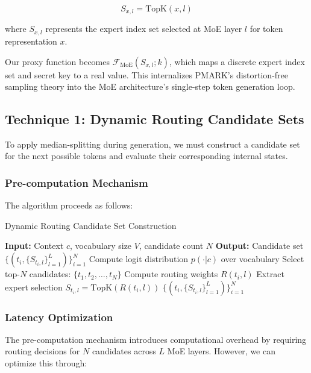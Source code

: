 \documentclass[letterpaper,twocolumn,10pt]{article}
\begin{document}
\begin{equation}
S_{x,l} = \text{TopK}(x, l)
\end{equation}

where $S_{x,l}$ represents the expert index set selected at MoE layer $l$ for token representation $x$.

Our proxy function becomes $\mathcal{F}_{\text{MoE}}(S_{x,l}; k)$, which maps a discrete expert index set and secret key to a real value. This internalizes PMARK's distortion-free sampling theory into the MoE architecture's single-step token generation loop.

\subsection{Technique 1: Dynamic Routing Candidate Sets}

To apply median-splitting during generation, we must construct a candidate set for the next possible tokens and evaluate their corresponding internal states.

\subsubsection{Pre-computation Mechanism}

The algorithm proceeds as follows:

\begin{algorithm}
\caption{Dynamic Routing Candidate Set Construction}
\begin{algorithmic}[1]
\STATE \textbf{Input:} Context $c$, vocabulary size $V$, candidate count $N$
\STATE \textbf{Output:} Candidate set $\{(t_i, \{S_{t_i,l}\}_{l=1}^L)\}_{i=1}^N$
\STATE Compute logit distribution $p(\cdot|c)$ over vocabulary
\STATE Select top-$N$ candidates: $\{t_1, t_2, \ldots, t_N\}$
        \STATE Compute routing weights $R(t_i, l)$
        \STATE Extract expert selection $S_{t_i,l} = \text{TopK}(R(t_i, l))$
    \ENDFOR
\ENDFOR
\RETURN $\{(t_i, \{S_{t_i,l}\}_{l=1}^L)\}_{i=1}^N$
\end{algorithmic}
\end{algorithm}

\subsubsection{Latency Optimization}

The pre-computation mechanism introduces computational overhead by requiring routing decisions for $N$ candidates across $L$ MoE layers. However, we can optimize this through:
\end{document}
